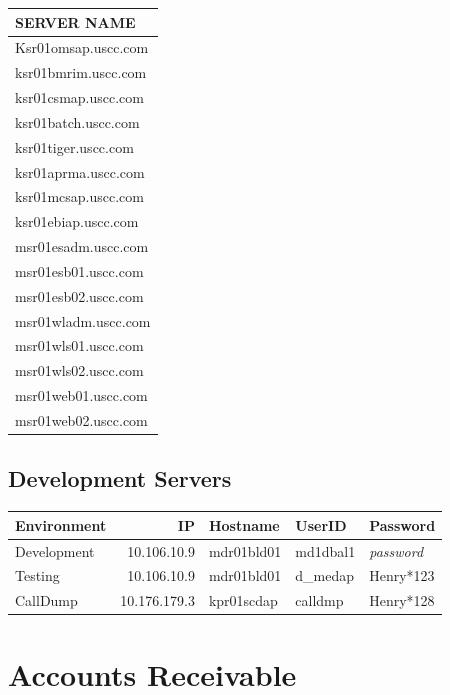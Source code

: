 \documentclass[12pt,twoside]{article}
\begin{document}
\begin{center}
\begin{tabular}{l}
\hline
 \textbf{SERVER NAME}  \\
\hline
 Ksr01omsap.uscc.com   \\
 ksr01bmrim.uscc.com   \\
 ksr01csmap.uscc.com   \\
 ksr01batch.uscc.com   \\
 ksr01tiger.uscc.com   \\
 ksr01aprma.uscc.com   \\
 ksr01mcsap.uscc.com   \\
 ksr01ebiap.uscc.com   \\
 msr01esadm.uscc.com   \\
 msr01esb01.uscc.com   \\
 msr01esb02.uscc.com   \\
 msr01wladm.uscc.com   \\
 msr01wls01.uscc.com   \\
 msr01wls02.uscc.com   \\
 msr01web01.uscc.com   \\
 msr01web02.uscc.com   \\
\hline
\end{tabular}
\end{center}
\subsection{Development Servers}
\label{sec-10-3}

\footnotesize

\begin{center}
\begin{tabular}{lrlll}
\hline
 \textbf{Environment}  &   \textbf{IP}  &  \textbf{Hostname}  &  \textbf{UserID}  &  \textbf{Password}  \\
\hline
 Development           &   10.106.10.9  &  mdr01bld01         &  md1dbal1         &  \emph{password}    \\
 Testing               &   10.106.10.9  &  mdr01bld01         &  d_medap          &  Henry*123          \\
 CallDump              &  10.176.179.3  &  kpr01scdap         &  calldmp          &  Henry*128          \\
\hline
\end{tabular}
\end{center}



\normalsize
\section{Accounts Receivable}
\label{sec-11}
\end{document}
